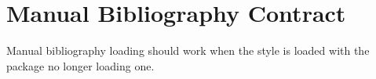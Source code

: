 \documentclass{article}
\begin{document}
\section{Manual Bibliography Contract}
Manual bibliography loading should work when the style is loaded with
the package no longer loading one.\autocite{butterick2019practical}

\printbibliography
\end{document}
